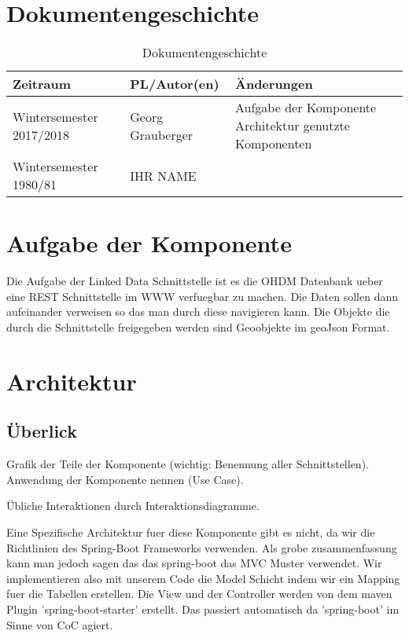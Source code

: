 \section{Dokumentengeschichte}
\begin{table}[h]
 \begin{tabular}{|l|l|p{4cm}|}
 \hline
 Zeitraum & PL/Autor(en) & Änderungen \\
 \hline
 Wintersemester 2017/2018 & Georg Grauberger & 
Aufgabe der Komponente \newline
Architektur \newline
genutzte Komponenten
 \\
 \hline
 Wintersemester 1980/81 & IHR NAME & 
 \\
 \hline
 \end{tabular}
 \caption{Dokumentengeschichte}
 \end{table}

\section{Aufgabe der Komponente}
Die Aufgabe der Linked Data Schnittstelle ist es die OHDM Datenbank ueber
eine REST Schnittstelle im WWW verfuegbar zu machen.\newline
Die Daten sollen dann aufeinander verweisen so das man durch diese navigieren
kann. Die Objekte die durch die Schnittstelle freigegeben werden sind Geoobjekte
im geoJson Format.
\section{Architektur}

\subsection{Überlick}
Grafik der Teile der Komponente (wichtig: Benennung aller Schnittstellen). 
Anwendung der Komponente nennen (Use Case).

Übliche Interaktionen durch Interaktionsdiagramme.

Eine Spezifische Architektur fuer diese Komponente gibt es nicht, da wir die Richtlinien
des Spring-Boot Frameworks verwenden.
Als grobe zusammenfassung kann man jedoch sagen das das spring-boot das MVC Muster verwendet.
Wir implementieren also mit unserem Code die Model Schicht indem wir ein Mapping
fuer die Tabellen erstellen.
Die View und der Controller werden von dem maven Plugin 'spring-boot-starter' erstellt.
Das passiert automatisch da 'spring-boot' im Sinne von CoC agiert.

